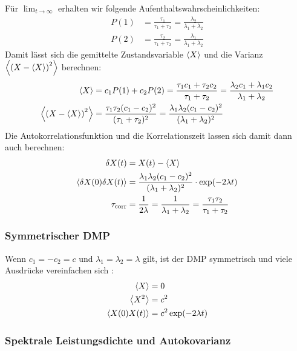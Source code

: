 \documentclass[main.tex]{subfiles}
\begin{document}
Für \( \lim_{t \to \infty} \) erhalten wir folgende
Aufenthaltswahrscheinlichkeiten:
\begin{align}
	P(1) & = \frac{\tau_1}{\tau_1 + \tau_2} =
	\frac{\lambda_2 }{\lambda_1 +
		\lambda_2}
	\\
	P(2) & = \frac{\tau_2}{\tau_1 + \tau_2} =
	\frac{\lambda_1 }{\lambda_1 +
		\lambda_2}
\end{align}
Damit lässt sich die gemittelte Zustandsvariable \(\expval{X}\) und die Varianz
\(\expval{\qty(X - \expval{X})^2}\) berechnen:
\begin{align}
	\expval{X}                      & = c_1 P(1) + c_2 P(2) = \frac{\tau_1
		c_1 + \tau_2
		c_2}{\tau_1 + \tau_2} = \frac{\lambda_2 c_1 + \lambda_1
		c_2}{\lambda_1 +
		\lambda_2}
	\\
	\expval{\qty(X - \expval{X})^2} & = \frac{\tau_1 \tau_2
		(c_1-c_2)^2}{(\tau_1 + \tau_2)^2} = \frac{\lambda_1 \lambda_2
		(c_1-c_2)^2}{(\lambda_1 + \lambda_2)^2}
\end{align}
Die Autokorrelationsfunktion und die Korrelationszeit lassen sich damit dann
auch berechnen:
\begin{align}
	\delta X(t)                     & = X(t) - \expval{X}
	\\
	\expval{\delta X(0)\delta X(t)} & = \frac{\lambda_1 \lambda_2
		(c_1-c_2)^2}{(\lambda_1 + \lambda_2)^2} \cdot \exp(-2\lambda t)
	\\
	\tau_\mathrm{corr}              & = \frac{1}{2\lambda} =
	\frac{1}{\lambda_1 +
		\lambda_2} = \frac{\tau_1 \tau_2}{\tau_1 + \tau_2}
\end{align}

\subsubsection*{Symmetrischer DMP}

Wenn \(c_1=-c_2=c\) und \(\lambda_1 = \lambda_2 = \lambda\) gilt, ist der DMP
symmetrisch und viele Ausdrücke vereinfachen sich \cite{matphys}:
\begin{align}
	\expval{X}        & = 0                     \\
	\expval{X^2}      & = c^2                   \\
	\expval{X(0)X(t)} & = c^2 \exp(-2\lambda t)
\end{align}

\subsubsection*{Spektrale Leistungsdichte und Autokovarianz}
\end{document}
